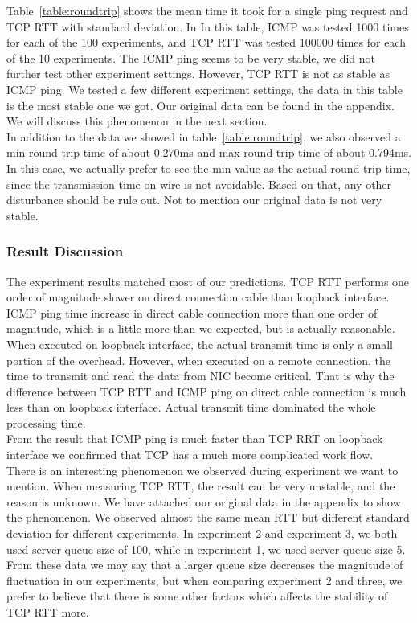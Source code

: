 \documentclass{article} %
\begin{document}
Table~\ref{table:roundtrip} shows the mean time it took for a single ping
request and TCP RTT with standard deviation. In In this table, ICMP was tested
1000 times for each of the 100 experiments, and TCP RTT was tested 100000 times
for each of the 10 experiments. The ICMP ping seems to be very stable, we did
not further test other experiment settings. However, TCP RTT is not as stable
as ICMP ping. We tested a few different experiment settings, the data in this
table is the most stable one we got. Our original data can be found in the
appendix. We will discuss this phenomenon in the next section. \\
In addition to the data we showed in table~\ref{table:roundtrip}, we also
observed a min round trip time of about 0.270ms and max round trip time of
about 0.794ms. In this case, we actually prefer to see the min value as the
actual round trip time, since the transmission time on wire is not avoidable.
Based on that, any other disturbance should be rule out. Not to mention our
original data is not very stable.\\

\subsubsection{Result Discussion}
The experiment results matched most of our predictions. TCP RTT performs one order of magnitude slower on direct connection cable than loopback interface. ICMP ping time increase in direct cable connection more than one order of magnitude, which is a little more than we expected, but is actually reasonable. When executed on loopback interface, the actual transmit time is only a small portion of the overhead. However, when executed on a remote connection, the time to transmit and read the data from NIC become critical. That is why the difference between TCP RTT and ICMP ping on direct cable connection is much less than on loopback interface. Actual transmit time dominated the whole processing time.\\
From the result that ICMP ping is much faster than TCP RRT on loopback interface we confirmed that TCP has a much more complicated work flow.\\
There is an interesting phenomenon we observed during experiment we want to mention. When measuring TCP RTT, the result can be very unstable, and the reason is unknown. We have attached our original data in the appendix to show the phenomenon. We observed almost the same mean RTT but different standard deviation for different experiments. In experiment 2 and experiment 3, we both used server queue size of 100, while in experiment 1, we used server queue size 5. From these data we may say that a larger queue size decreases the magnitude of fluctuation in our experiments, but when comparing experiment 2 and three, we prefer to believe that there is some other factors which affects the stability of TCP RTT more. \\
\end{document}
